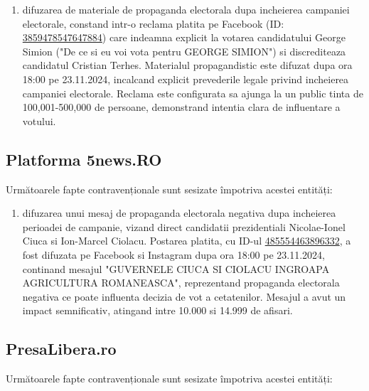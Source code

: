 \documentclass[a4paper,12pt]{article}
\begin{document}
\begin{enumerate}[leftmargin=*, label=\arabic*.)]
    \item difuzarea de materiale de propaganda electorala dupa incheierea campaniei electorale, constand intr-o reclama platita pe Facebook (ID: \href{https://www.facebook.com/ads/library/?id=3859478547647884}{3859478547647884}) care indeamna explicit la votarea candidatului George Simion ("De ce si eu voi vota pentru GEORGE SIMION") si discrediteaza candidatul Cristian Terhes. Materialul propagandistic este difuzat dupa ora 18:00 pe 23.11.2024, incalcand explicit prevederile legale privind incheierea campaniei electorale. Reclama este configurata sa ajunga la un public tinta de 100,001-500,000 de persoane, demonstrand intentia clara de influentare a votului.
\end{enumerate}

\vspace{0.5cm}

\subsection{Platforma 5news.RO}
Următoarele fapte contravenționale sunt sesizate împotriva acestei entități:

\begin{enumerate}[leftmargin=*, label=\arabic*.)]
    \item difuzarea unui mesaj de propaganda electorala negativa dupa incheierea perioadei de campanie, vizand direct candidatii prezidentiali Nicolae-Ionel Ciuca si Ion-Marcel Ciolacu. Postarea platita, cu ID-ul \href{https://www.facebook.com/ads/library/?id=485554463896332}{485554463896332}, a fost difuzata pe Facebook si Instagram dupa ora 18:00 pe 23.11.2024, continand mesajul "GUVERNELE CIUCA SI CIOLACU INGROAPA AGRICULTURA ROMANEASCA", reprezentand propaganda electorala negativa ce poate influenta decizia de vot a cetatenilor. Mesajul a avut un impact semnificativ, atingand intre 10.000 si 14.999 de afisari.
\end{enumerate}

\vspace{0.5cm}

\subsection{PresaLibera.ro}
Următoarele fapte contravenționale sunt sesizate împotriva acestei entități:
\end{document}
